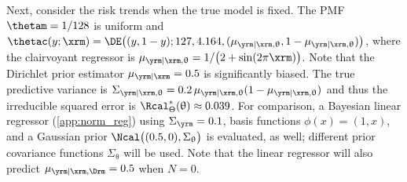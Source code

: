 \documentclass[12pt]{report}
\begin{document}
Next, consider the risk trends when the true model is fixed. The PMF $\thetam = 1/128$ is uniform and $\thetac(y;\xrm) = \DE\big((y, 1-y); 127, 4.164, (\mu_{\yrm | \xrm,\uptheta}, 1-\mu_{\yrm | \xrm,\uptheta})\big)$, where the clairvoyant regressor is $\mu_{\yrm | \xrm,\uptheta} = 1 / \big(2 + \sin(2\pi \xrm)\big)$. Note that the Dirichlet prior estimator $\mu_{\yrm | \xrm} = 0.5$ is significantly biased. The true predictive variance is $\Sigma_{\yrm | \xrm, \uptheta} = 0.2 \, \mu_{\yrm | \xrm, \uptheta} (1 - \mu_{\yrm | \xrm, \uptheta})$ and thus the irreducible squared error is $\Rcal_{\Theta}^*(\uptheta) \approx 0.039 $. For comparison, a Bayesian linear regressor (\cref{app:norm_reg}) using $\Sigma_{\yrm}=0.1$, basis functions $\phi(x) = (1, x)$, and a Gaussian prior $\Ncal\big((0.5, 0), \Sigma_{\uptheta}\big)$ is evaluated, as well; different prior covariance functions $\Sigma_{\uptheta}$ will be used. Note that the linear regressor will also predict $\mu_{\yrm | \xrm, \Drm} = 0.5$ when $N=0$.
\end{document}
